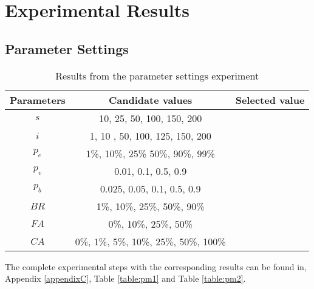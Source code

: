 \section{Experimental Results}


\subsection{Parameter Settings}
\label{subsec:parameterSettings_results}

	\begin{table}[H]
	\centering
    \begin{tabular}{|c|c||c|}
 	\hline
 	Parameters & Candidate values & Selected value\\
 	\hline
    $s$ & 10, 25, 50, 100, 150, 200 & ~ \\
    $i$ & 1, 10 , 50, 100, 125, 150, 200 & ~ \\
    $p_{e}$ & 1\%, 10\%, 25\% 50\%, 90\%, 99\% & ~ \\
    $p_{v}$ & 0.01, 0.1, 0.5, 0.9 & ~  \\
    $p_{b}$ & 0.025, 0.05, 0.1, 0.5, 0.9 & ~ \\
    $BR$ & 1\%, 10\%, 25\%, 50\%, 90\% & ~ \\
    $FA$ & 0\%, 10\%, 25\%, 50\%  & ~ \\
    $CA$ & 0\%, 1\%, 5\%, 10\%, 25\%, 50\%, 100\% & ~ \\
	\hline
    \end{tabular}
    \caption {Results from the parameter settings experiment}
    The complete experimental steps with the corresponding results can be found in, Appendix \ref{appendixC}, Table \vref{table:pm1} and Table \vref{table:pm2}.
    \label{table:parameterSettings2}
	\end{table}

